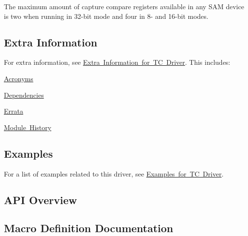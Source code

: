 The maximum amount of capture compare registers available in any S\+AM device is two when running in 32-\/bit mode and four in 8-\/ and 16-\/bit modes.\hypertarget{group__asfdoc__sam0__tc__group_asfdoc_sam0_tc_extra_info}{}\subsection{Extra Information}\label{group__asfdoc__sam0__tc__group_asfdoc_sam0_tc_extra_info}
For extra information, see \mbox{\hyperlink{asfdoc_sam0_tc_extra}{Extra Information for TC Driver}}. This includes\+:
\begin{DoxyItemize}
\item \mbox{\hyperlink{asfdoc_sam0_tc_extra_asfdoc_sam0_tc_extra_acronyms}{Acronyms}}
\item \mbox{\hyperlink{asfdoc_sam0_tc_extra_asfdoc_sam0_tc_extra_dependencies}{Dependencies}}
\item \mbox{\hyperlink{asfdoc_sam0_tc_extra_asfdoc_sam0_tc_extra_errata}{Errata}}
\item \mbox{\hyperlink{asfdoc_sam0_tc_extra_asfdoc_sam0_tc_extra_history}{Module History}}
\end{DoxyItemize}\hypertarget{group__asfdoc__sam0__tc__group_asfdoc_sam0_tc_examples}{}\subsection{Examples}\label{group__asfdoc__sam0__tc__group_asfdoc_sam0_tc_examples}
For a list of examples related to this driver, see \mbox{\hyperlink{asfdoc_sam0_tc_exqsg}{Examples for TC Driver}}.\hypertarget{group__asfdoc__sam0__tc__group_asfdoc_sam0_tc_api_overview}{}\subsection{A\+P\+I Overview}\label{group__asfdoc__sam0__tc__group_asfdoc_sam0_tc_api_overview}


\subsection{Macro Definition Documentation}
\mbox{\label{group__asfdoc__sam0__tc__group_gac837f9db5df1793578c195a979c6a9d3}} 
